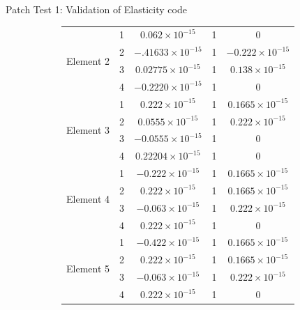 \documentclass{beamer}
\begin{document}
\begin{frame}[t,fragile]{Patch Test 1: Validation of Elasticity code}
\begin{figure}
\begin{subfigure}{0.45\textwidth}
{\begin{tabular}{|c|c|c|c|c|}
\hline
\multirow{4}{5em}{Element 2} & 1 & $0.062\times 10^{-15}$ &1& $0$\\
& 2 & $-.41633\times 10^{-15}$ &1& $-0.222\times 10^{-15}$\\
& 3 & $0.02775\times 10^{-15}$ &1& $0.138\times 10^{-15}$\\
& 4 & $-0.2220\times 10^{-15}$ &1& $0$\\
\hline
\multirow{4}{5em}{Element 3} & 1 & $0.222\times 10^{-15}$ &1& $0.1665\times 10^{-15}$\\
& 2 & $0.0555\times 10^{-15}$ &1& $0.222\times 10^{-15}$\\
& 3 & $-0.0555\times 10^{-15}$ &1& $0$\\
& 4 & $0.22204\times 10^{-15}$ &1& $0$\\
\hline
\multirow{4}{5em}{Element 4} & 1 & $-0.222\times 10^{-15}$ &1& $0.1665\times 10^{-15}$\\
& 2 & $0.222\times 10^{-15}$ &1& $0.1665\times 10^{-15}$\\
& 3 & $-0.063\times 10^{-15}$ &1& $0.222\times 10^{-15}$\\
& 4 & $0.222\times 10^{-15}$ &1& $0$\\
\hline
\multirow{4}{5em}{Element 5} & 1 & $-0.422\times 10^{-15}$ &1& $0.1665\times 10^{-15}$\\
& 2 & $0.222\times 10^{-15}$ &1& $0.1665\times 10^{-15}$\\
& 3 & $-0.063\times 10^{-15}$ &1& $0.222\times 10^{-15}$\\
& 4 & $0.222\times 10^{-15}$ &1& $0$\\
\hline
\end{tabular}}
     \end{subfigure}
  \end{figure}
\end{frame}
\end{document}
